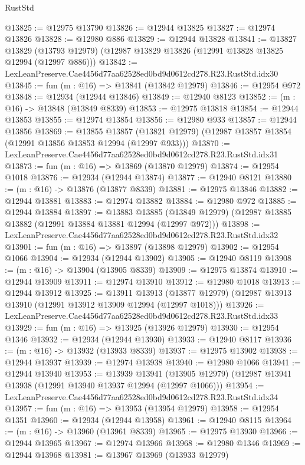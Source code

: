 \begin{lexlean}{RustStd}
\begin{coremodule}
@13825 := @12975 @13790
@13826 := @12944 @13825
@13827 := @12974 @13826
@13828 := @12980 @886
@13829 := @12944 @13828
@13841 := @13827
    @13829
    (@13793 @12979)
    (@12987 @13829 @13826 (@12991 @13828 @13825 @12994 (@12997 @886)))
@13842 := LexLeanPreserve.Cae4456d77aa62528ed0bd9d0612cd278.R23.RustStd.idx30
@13845 := fun (m : @16) => @13841 (@13842 @12979)
@13846 := @12954 @972
@13848 := @12934 (@12944 @13846)
@13849 := @12940 @8123
@13852 := (m : @16) -> @13848 (@13849 @8339)
@13853 := @12975 @13818
@13854 := @12944 @13853
@13855 := @12974 @13854
@13856 := @12980 @933
@13857 := @12944 @13856
@13869 := @13855
    @13857
    (@13821 @12979)
    (@12987 @13857 @13854 (@12991 @13856 @13853 @12994 (@12997 @933)))
@13870 := LexLeanPreserve.Cae4456d77aa62528ed0bd9d0612cd278.R23.RustStd.idx31
@13873 := fun (m : @16) => @13869 (@13870 @12979)
@13874 := @12954 @1018
@13876 := @12934 (@12944 @13874)
@13877 := @12940 @8121
@13880 := (m : @16) -> @13876 (@13877 @8339)
@13881 := @12975 @13846
@13882 := @12944 @13881
@13883 := @12974 @13882
@13884 := @12980 @972
@13885 := @12944 @13884
@13897 := @13883
    @13885
    (@13849 @12979)
    (@12987 @13885 @13882 (@12991 @13884 @13881 @12994 (@12997 @972)))
@13898 := LexLeanPreserve.Cae4456d77aa62528ed0bd9d0612cd278.R23.RustStd.idx32
@13901 := fun (m : @16) => @13897 (@13898 @12979)
@13902 := @12954 @1066
@13904 := @12934 (@12944 @13902)
@13905 := @12940 @8119
@13908 := (m : @16) -> @13904 (@13905 @8339)
@13909 := @12975 @13874
@13910 := @12944 @13909
@13911 := @12974 @13910
@13912 := @12980 @1018
@13913 := @12944 @13912
@13925 := @13911
    @13913
    (@13877 @12979)
    (@12987 @13913 @13910 (@12991 @13912 @13909 @12994 (@12997 @1018)))
@13926 := LexLeanPreserve.Cae4456d77aa62528ed0bd9d0612cd278.R23.RustStd.idx33
@13929 := fun (m : @16) => @13925 (@13926 @12979)
@13930 := @12954 @1346
@13932 := @12934 (@12944 @13930)
@13933 := @12940 @8117
@13936 := (m : @16) -> @13932 (@13933 @8339)
@13937 := @12975 @13902
@13938 := @12944 @13937
@13939 := @12974 @13938
@13940 := @12980 @1066
@13941 := @12944 @13940
@13953 := @13939
    @13941
    (@13905 @12979)
    (@12987 @13941 @13938 (@12991 @13940 @13937 @12994 (@12997 @1066)))
@13954 := LexLeanPreserve.Cae4456d77aa62528ed0bd9d0612cd278.R23.RustStd.idx34
@13957 := fun (m : @16) => @13953 (@13954 @12979)
@13958 := @12954 @1351
@13960 := @12934 (@12944 @13958)
@13961 := @12940 @8115
@13964 := (m : @16) -> @13960 (@13961 @8339)
@13965 := @12975 @13930
@13966 := @12944 @13965
@13967 := @12974 @13966
@13968 := @12980 @1346
@13969 := @12944 @13968
@13981 := @13967
    @13969
    (@13933 @12979)

\end{coremodule}
\end{lexlean}
